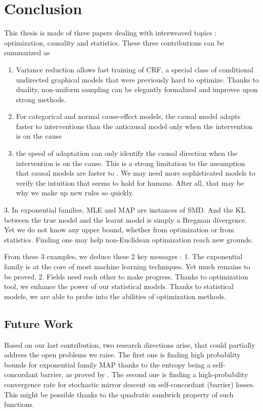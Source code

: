 \chapter{Conclusion}
\label{chap:discussion}

This thesis is made  of three papers dealing with interweaved topics : optimization, causality and statistics. 
These three contributions can be summarized as 
\begin{enumerate}
	\item Variance reduction allows fast training of CRF, a special class of conditional undirected graphical models that were previously hard to optimize. Thanks to duality, non-uniform sampling can be elegantly formalized and improves upon strong methods.
	\item For categorical and normal cause-effect models, the causal model adapts faster to interventions than the anticausal model only when the intervention is on the cause 
	\item 
	 the speed of adaptation can only identify the causal direction when the intervention is on the cause. This is a strong limitation to the assumption that causal models are faster to . We may need more sophisticated models to verify the intuition that seems to hold for humans. After all, that may be why we make up new rules so quickly.
\end{enumerate}
3. In exponential families, MLE and MAP are instances of SMD. And the KL between the true model and the learnt model is simply a Bregman divergence. Yet we do not know any upper bound, whether from optimization or from statistics. Finding one may help non-Euclidean optimization reach new grounds.


From these 3 examples, we deduce these 2 key messages : 
1. The exponential family is at the core of most machine learning techniques. Yet much remains to be proved.
2. Fields need each other to make progress. Thanks to optimization tool, we enhance the power of our statistical models. Thanks to statistical models, we are able to probe into the abilities of optimization methods.


\section{Future Work}
Based on our last contribution, two research directions arise, that could partially address the open problems we raise.
The first one is finding high probability bounds for exponential family MAP thanks to the entropy being a self-concordant barrier, as proved by \citep{bubeck2015entropic}.
The second one is finding a high-probability convergence rate for stochastic mirror descent on self-concordant (barrier) losses. This might be possible thanks to the quadratic sandwich property of such functions. 